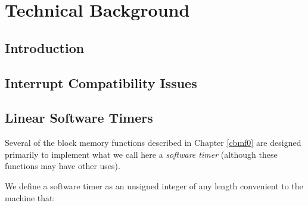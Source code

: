 
\chapter{Technical Background}        
\label{ctbg0}

\section{Introduction}
\label{ctbg0:sint0}


\section{Interrupt Compatibility Issues}
\label{ctbg0:sici0}


\section{Linear Software Timers}
\label{ctbg0:slst0}

Several of the block memory functions described in
Chapter \ref{cbmf0} are designed primarily to 
implement what we call here a 
\emph{software timer} (although these functions
may have other uses).

We define a software timer as an unsigned integer
of any length convenient to the machine that:

